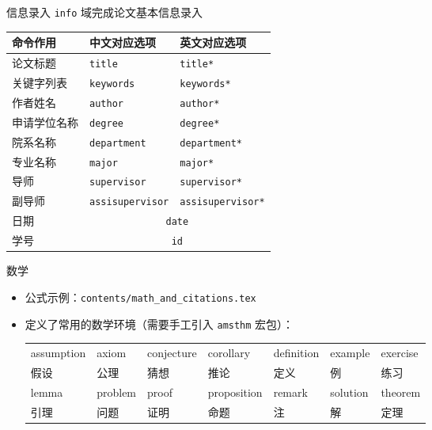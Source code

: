 \begin{frame}[fragile]{信息录入}
  \verb|info| 域完成论文基本信息录入
  \begin{table}[h]
    \centering
    \footnotesize
    \begin{tabular}{lll} \toprule
      命令作用   & 中文对应选项                            & 英文对应选项                 \\ \midrule
      论文标题   & \verb|title|                      & \verb|title*|
      \\
      关键字列表  & \verb|keywords|                   & \verb|keywords*|       \\
      作者姓名   & \verb|author|                     & \verb|author*|         \\
      申请学位名称 & \verb|degree|                     & \verb|degree*|         \\
      院系名称   & \verb|department|                 & \verb|department*|     \\
      专业名称   & \verb|major|                      & \verb|major*|          \\
      导师     & \verb|supervisor|                 & \verb|supervisor*|
      \\
      副导师    & \verb|assisupervisor|             & \verb|assisupervisor*|
      \\
      日期     & \multicolumn{2}{c}{\texttt{date}}
      \\
      学号     & \multicolumn{2}{c}{\texttt{id}}
      \\
      \bottomrule
    \end{tabular}
  \end{table}
\end{frame}

\begin{frame}[fragile]{数学}
  \begin{itemize}
    \item 公式示例：\nolinkurl{contents/math_and_citations.tex}
    \item \SJTUThesis{} 定义了常用的数学环境（需要手工引入 \verb|amsthm| 宏包）：
          \begin{table}[h]
            \centering
            \footnotesize
            \begin{tabular}{*{7}{l}}\toprule
              assumption & axiom    & conjecture & corollary   & definition &
              example    & exercise
              \\
              假设         & 公理       & 猜想         & 推论          & 定义         & 例 & 练习
              \\\midrule
              lemma      & problem  & proof      & proposition & remark     &
              solution   & theorem
              \\
              引理         & 问题       & 证明         & 命题          & 注          & 解 &
              定理
              \\\bottomrule
            \end{tabular}
          \end{table}
  \end{itemize}
\end{frame}

